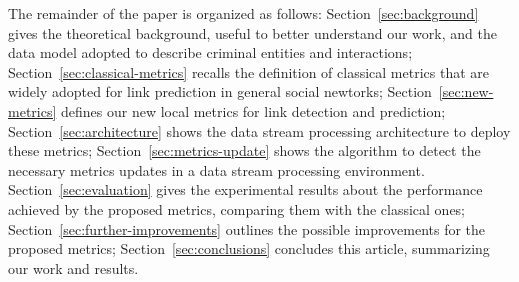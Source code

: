 
The remainder of the paper is organized as follows:
%
Section~\ref{sec:background} gives the theoretical background, useful to better understand our work, and the data model adopted to describe criminal entities and interactions;
%
Section~\ref{sec:classical-metrics} recalls the definition of classical metrics that are widely adopted for link prediction in general social newtorks;
%
Section~\ref{sec:new-metrics} defines our new local metrics for link detection and prediction;
%
Section~\ref{sec:architecture} shows the data stream processing architecture to deploy these metrics;
%
Section~\ref{sec:metrics-update} shows the algorithm to detect the necessary metrics updates in a data stream processing environment.
%
Section~\ref{sec:evaluation} gives the experimental results about the performance achieved by the proposed metrics, comparing them with the classical ones;
%
Section~\ref{sec:further-improvements} outlines the possible improvements for the proposed metrics;
%
Section~\ref{sec:conclusions} concludes this article, summarizing our work and results.




%
%

